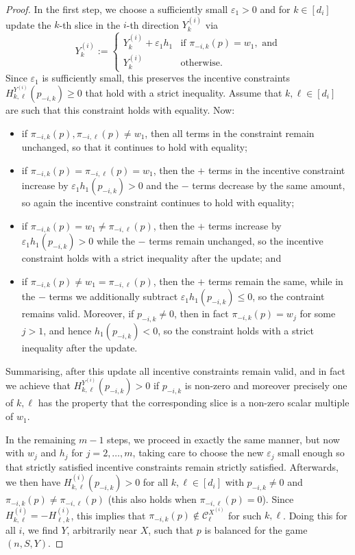 \documentclass[11pt]{amsart}
\theoremstyle{definition}
\numberwithin{subcase}{case}
\begin{document}
\begin{proof}
In the first step, we choose a sufficiently small $\varepsilon_1 > 0$ 
and for $k \in [d_i]$ update the $k$-th slice in the $i$-th direction $Y^{(i)}_k$ via 
\[Y^{(i)}_k:=\begin{cases}
	Y^{(i)}_k + \varepsilon_1 h_1 & \text{if } \pi_{-i,k}(p)=w_1, \text{ and}\\
	Y^{(i)}_k  & \text{otherwise}. 
	\end{cases}
\]
Since $\varepsilon_1$ is sufficiently small, this preserves the incentive
constraints $H^{Y^{(i)}}_{k,\ell}(p_{-i,k}) \geq 0$ that hold with a strict
inequality. Assume that $k,\ell \in [d_i]$ are such that this constraint holds
with equality. Now:
\begin{itemize}
\item if $\pi_{-i,k}(p),\pi_{-i,\ell}(p) \neq w_1$,
then all terms in the constraint remain unchanged, so that it continues
to hold with equality;
\item if $\pi_{-i,k}(p)=\pi_{-i,\ell}(p)=w_1$, then the $+$ terms in the
incentive constraint increase by $\varepsilon_1 h_1(p_{-i,k})>0$ and the $-$
terms decrease by the same amount, so again the incentive constraint
continues to hold with equality;
\item if $\pi_{-i,k}(p)=w_1\neq
\pi_{-i,\ell}(p)$, then the $+$ terms increase by
$\varepsilon_1 h_1(p_{-i,k})>0$ while the $-$ terms remain unchanged, so the
incentive constraint holds with a strict inequality after the update;
and 
\item if $\pi_{-i,k}(p) \neq w_1=\pi_{-i,\ell}(p)$, then the
$+$ terms remain the same, while in the $-$ terms we additionally
subtract $\varepsilon_1 h_1(p_{-i,k}) \leq 0$, so the contraint remains
valid. Moreover, if $p_{-i,k} \neq 0$,
then in fact $\pi_{-i,k}(p)=w_j$ for some $j>1$, and hence
$h_1(p_{-i,k})<0$, so the constraint holds with a strict inequality
after the update. 
\end{itemize}
Summarising, after this update all incentive constraints remain valid,
and in fact we achieve that $H^{Y^{(i)}}_{k,\ell}(p_{-i,k}) > 0$ if $p_{-i,k}$
is non-zero and moreover precisely one of $k,\ell$ has the property that
the corresponding slice is a non-zero scalar multiple of $w_1$.

In the remaining $m-1$ steps, we proceed in exactly the same manner,
but now with $w_j$ and $h_j$ for $j=2,\ldots,m$, taking care to
choose the new $\varepsilon_j$ small enough so that strictly satisfied
incentive constraints remain strictly satisfied. Afterwards, we
then have $H^{(i)}_{k,\ell}(p_{-i,k})>0$ for all $k,\ell \in [d_i]$
with $p_{-i,k} \neq 0$ and $\pi_{-i,k}(p) \neq \pi_{-i,\ell}(p)$
(this also holds when $\pi_{-i,\ell}(p)=0$). Since
$H^{(i)}_{k,\ell}=-H^{(i)}_{\ell,k}$, this
implies that $\pi_{-i,k}(p) \not \in \mathcal{C}^{X^{(i)}}_\ell$ for
such $k,\ell$. Doing this for all $i$, we find $Y$, arbitrarily near $X$,
such that $p$ is balanced for the game $(n,S,Y)$.
\end{proof}
\end{document}
